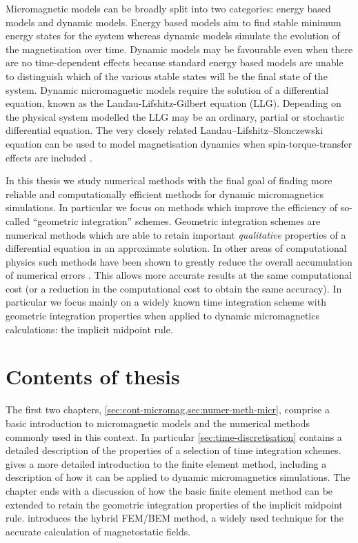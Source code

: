 Micromagnetic models can be broadly split into two categories: energy based models and dynamic models.
Energy based models aim to find stable minimum energy states for the system whereas
dynamic models simulate the evolution of the magnetisation over time.
Dynamic models may be favourable even when there are no time-dependent effects because standard energy based models are unable to distinguish which of the various stable states will be the final state of the system.
Dynamic micromagnetic models require the solution of a differential equation, known as the Landau-Lifshitz-Gilbert equation (LLG).
Depending on the physical system modelled the LLG may be an ordinary, partial or stochastic differential equation.
The very closely related Landau–Lifshitz–Slonczewski equation can be used to model magnetisation dynamics when spin-torque-transfer effects are included \cite{Slonczewski1996}.


In this thesis we study numerical methods with the final goal of finding more reliable and computationally efficient methods for dynamic micromagnetics simulations.
In particular we focus on methods which improve the efficiency of so-called ``geometric integration'' schemes.
Geometric integration schemes are numerical methods which are able to retain important \emph{qualitative} properties of a differential equation in an approximate solution.
In other areas of computational physics such methods have been shown to greatly reduce the overall accumulation of numerical errors \cite[77]{Iserles2009}.
This allows more accurate results at the same computational cost (or a reduction in the computational cost to obtain the same accuracy).
In particular we focus mainly on a widely known time integration scheme with geometric integration properties when applied to dynamic micromagnetics calculations: the implicit midpoint rule.



\section{Contents of thesis}

The first two chapters, \cref{sec:cont-micromag,sec:numer-meth-micr}, comprise a basic introduction to micromagnetic models and the numerical methods commonly used in this context.
In particular \cref{sec:time-discretisation} contains a detailed description of the properties of a selection of time integration schemes.
 gives a more detailed introduction to the finite element method, including a description of how it can be applied to dynamic micromagnetics simulations.
The chapter ends with a discussion of how the basic finite element method can be extended to retain the geometric integration properties of the implicit midpoint rule.
 introduces the hybrid FEM/BEM method, a widely used technique for the accurate calculation of magnetostatic fields.

